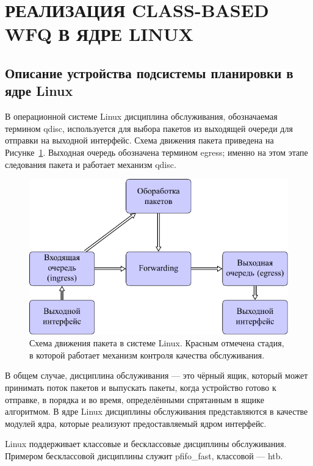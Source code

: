 \section{РЕАЛИЗАЦИЯ CLASS-BASED WFQ В ЯДРЕ LINUX}

	\subsection{Описание устройства подсистемы планировки в ядре Linux}

	В операционной системе Linux
	дисциплина обслуживания, обозначаемая термином qdisc, используется
	для выбора пакетов из выходящей очереди для отправки на выходной интерфейс.
	Схема движения пакета приведена на Рисунке~\ref{pic:flow}. Выходная очередь
	обозначена термином egress; именно на этом этапе следования пакета
	и работает механизм qdisc.\cite{lartc}

    \begin{figure}[ht!]
        \center
        \includegraphics[scale=1.3]{pdfimages/qdisc.pdf}
        \caption{Схема движения пакета в системе Linux\cite{tcpip}. Красным отмечена стадия, в которой
				 работает механизм контроля качества обслуживания.}
		\label{pic:flow}
    \end{figure}

	В общем случае, дисциплина обслуживания --- это чёрный ящик, который может
	принимать поток пакетов и выпускать пакеты,
	когда устройство
	готово к отправке, в порядка и во время, определёнными спрятанным в ящике
	алгоритмом. В ядре Linux дисциплины обслуживания представляются в качестве
	модулей ядра, которые реализуют предоставляемый ядром интерфейс.

	Linux поддерживает классовые и бесклассовые дисциплины обслуживания. Примером
	бесклассовой дисциплины служит pfifo\_fast, классовой --- htb.\cite{lartc}

